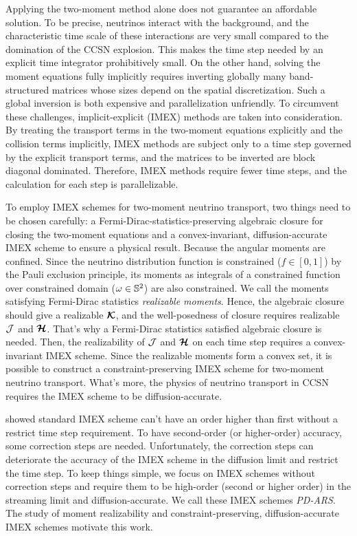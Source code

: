 Applying the two-moment method alone does not guarantee an affordable solution.
To be precise, neutrinos interact with the background, and the characteristic time scale of these interactions are very small compared to the domination of the CCSN explosion. 
This makes the time step needed by an explicit time integrator prohibitively small. 
On the other hand, solving the moment equations fully implicitly requires inverting globally many band-structured matrices whose sizes depend on the spatial discretization.
Such a global inversion is both expensive and parallelization unfriendly.
To circumvent these challenges, implicit-explicit (IMEX) methods are taken into consideration.
By treating the transport terms in the two-moment equations explicitly and the collision terms implicitly, IMEX methods are subject only to a time step governed by the explicit transport terms, and the matrices to be inverted are block diagonal dominated.
Therefore, IMEX methods require fewer time steps, and the calculation for each step is parallelizable.  

To employ IMEX schemes for two-moment neutrino transport, two things need to be chosen carefully: a Fermi-Dirac-statistics-preserving algebraic closure for closing the two-moment equations and a convex-invariant, diffusion-accurate IMEX scheme to ensure a physical result.
Because the angular moments are confined.
Since the neutrino distribution function is constrained ($f\in[0,1]$) by the Pauli exclusion principle, its moments as integrals of a constrained function over constrained domain ($\omega\in\mathbb{S}^{2}$) are also constrained.
We call the moments satisfying Fermi-Dirac statistics \textit{realizable moments}.
Hence, the algebraic closure should give a realizable $\boldsymbol{\mathcal{K}}$, and the well-posedness of closure requires realizable $\mathcal{J}$ and $\boldsymbol{\mathcal{H}}$.
That's why a Fermi-Dirac statistics satisfied algebraic closure is needed.
Then, the realizability of $\mathcal{J}$ and $\boldsymbol{\mathcal{H}}$ on each time step requires a convex-invariant IMEX scheme.
Since the realizable moments form a convex set, it is possible to construct a constraint-preserving IMEX scheme for two-moment neutrino transport.
What's more, the physics of neutrino transport in CCSN requires the IMEX scheme to be diffusion-accurate.

\cite{gottlieb_etal_2001} showed standard IMEX scheme can't have an order higher than first without a restrict time step requirement.
To have second-order (or higher-order) accuracy, some correction steps are needed.
Unfortunately, the correction steps can deteriorate the accuracy of the IMEX scheme in the diffusion limit and restrict the time step.
To keep things simple, we focus on IMEX schemes without correction steps and require them to be high-order (second or higher order) in the streaming limit and diffusion-accurate.
We call these IMEX schemes \textit{PD-ARS}.
The study of moment realizability and constraint-preserving, diffusion-accurate IMEX schemes motivate this work.

